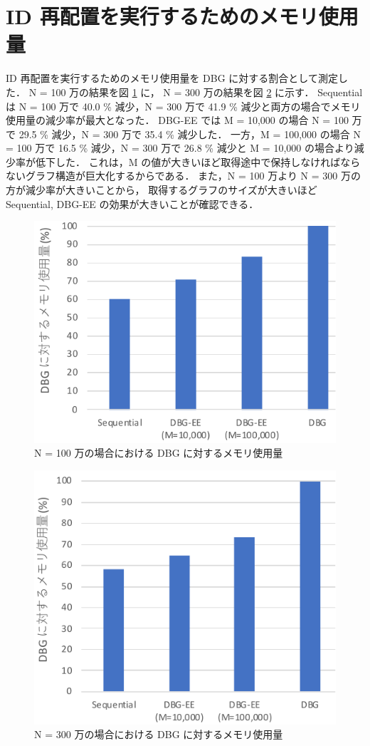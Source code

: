 \section{ID 再配置を実行するためのメモリ使用量}
ID 再配置を実行するためのメモリ使用量を DBG に対する割合として測定した．
N = 100 万の結果を図 \ref{memory_usage_1000000} に，
N = 300 万の結果を図 \ref{memory_usage_3000000} に示す． 
Sequential は N = 100 万で 40.0 \% 減少，N = 300 万で 41.9 \% 減少と両方の場合でメモリ使用量の減少率が最大となった．
DBG-EE では M = 10,000 の場合 N = 100 万で 29.5 \% 減少，N = 300 万で 35.4 \% 減少した．
一方，M = 100,000 の場合 N = 100 万で 16.5 \% 減少，N = 300 万で 26.8 \% 減少と M = 10,000 の場合より減少率が低下した．
これは，M の値が大きいほど取得途中で保持しなければならないグラフ構造が巨大化するからである．
また，N = 100 万より N = 300 万の方が減少率が大きいことから，
取得するグラフのサイズが大きいほど Sequential, DBG-EE の効果が大きいことが確認できる．
\begin{figure}[t]
  \centering
  \includegraphics[width=0.8\linewidth]{./figure/memory_usage_10000.pdf}
  \caption{N = 100 万の場合における DBG に対するメモリ使用量}
  \label{memory_usage_1000000}
\end{figure}

\begin{figure}[t]
  \centering
  \includegraphics[width=0.8\linewidth]{./figure/memory_usage_3000000.pdf}
  \caption{N = 300 万の場合における DBG に対するメモリ使用量}
  \label{memory_usage_3000000}
\end{figure}

